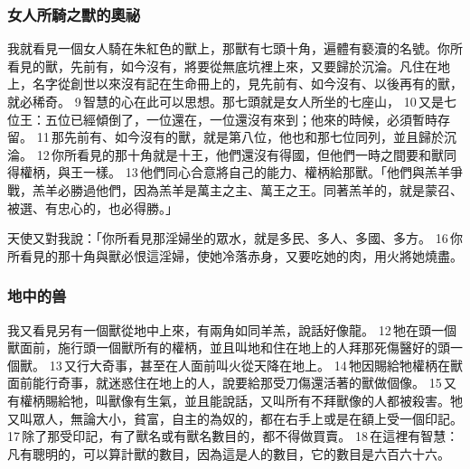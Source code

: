 \subsubsection{女人所騎之獸的奧祕}
我就看見一個女人騎在朱紅色的獸上，那獸有七頭十角，遍體有褻瀆的名號。你所看見的獸，先前有，如今沒有，將要從無底坑裡上來，又要歸於沉淪。凡住在地上，名字從創世以來沒有記在生命冊上的，見先前有、如今沒有、以後再有的獸，就必稀奇。 9 智慧的心在此可以思想。那七頭就是女人所坐的七座山， 10 又是七位王：五位已經傾倒了，一位還在，一位還沒有來到；他來的時候，必須暫時存留。 11 那先前有、如今沒有的獸，就是第八位，他也和那七位同列，並且歸於沉淪。 12 你所看見的那十角就是十王，他們還沒有得國，但他們一時之間要和獸同得權柄，與王一樣。 13 他們同心合意將自己的能力、權柄給那獸。「他們與羔羊爭戰，羔羊必勝過他們，因為羔羊是萬主之主、萬王之王。同著羔羊的，就是蒙召、被選、有忠心的，也必得勝。」

天使又對我說：「你所看見那淫婦坐的眾水，就是多民、多人、多國、多方。 16 你所看見的那十角與獸必恨這淫婦，使她冷落赤身，又要吃她的肉，用火將她燒盡。

\subsubsection{地中的兽}
我又看見另有一個獸從地中上來，有兩角如同羊羔，說話好像龍。 12 牠在頭一個獸面前，施行頭一個獸所有的權柄，並且叫地和住在地上的人拜那死傷醫好的頭一個獸。 13 又行大奇事，甚至在人面前叫火從天降在地上。 14 牠因賜給牠權柄在獸面前能行奇事，就迷惑住在地上的人，說要給那受刀傷還活著的獸做個像。 15 又有權柄賜給牠，叫獸像有生氣，並且能說話，又叫所有不拜獸像的人都被殺害。牠又叫眾人，無論大小，貧富，自主的為奴的，都在右手上或是在額上受一個印記。 17 除了那受印記，有了獸名或有獸名數目的，都不得做買賣。 18 在這裡有智慧：凡有聰明的，可以算計獸的數目，因為這是人的數目，它的數目是六百六十六。

